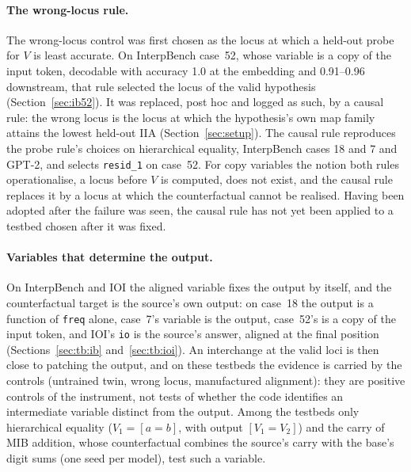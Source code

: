 \documentclass[11pt,a4paper]{article}
\begin{document}
\paragraph{The wrong-locus rule.} The wrong-locus control was first chosen as the locus at which a held-out probe for $V$ is least accurate. On InterpBench case~52, whose variable is a copy of the input token, decodable with accuracy 1.0 at the embedding and 0.91--0.96 downstream, that rule selected the locus of the valid hypothesis (Section~\ref{sec:ib52}). It was replaced, post hoc and logged as such, by a causal rule: the wrong locus is the locus at which the hypothesis's own map family attains the lowest held-out IIA (Section~\ref{sec:setup}). The causal rule reproduces the probe rule's choices on hierarchical equality, InterpBench cases 18 and 7 and GPT-2, and selects \texttt{resid\_1} on case~52. For copy variables the notion both rules operationalise, a locus before $V$ is computed, does not exist, and the causal rule replaces it by a locus at which the counterfactual cannot be realised. Having been adopted after the failure was seen, the causal rule has not yet been applied to a testbed chosen after it was fixed.

\paragraph{Variables that determine the output.} On InterpBench and IOI the aligned variable fixes the output by itself, and the counterfactual target is the source's own output: on case~18 the output is a function of \texttt{freq} alone, case~7's variable is the output, case~52's is a copy of the input token, and IOI's \texttt{io} is the source's answer, aligned at the final position (Sections~\ref{sec:tb:ib} and~\ref{sec:tb:ioi}). An interchange at the valid loci is then close to patching the output, and on these testbeds the evidence is carried by the controls (untrained twin, wrong locus, manufactured alignment): they are positive controls of the instrument, not tests of whether the code identifies an intermediate variable distinct from the output. Among the testbeds only hierarchical equality ($V_1=[a=b]$, with output $[V_1=V_2]$) and the carry of MIB addition, whose counterfactual combines the source's carry with the base's digit sums (one seed per model), test such a variable.
\end{document}
